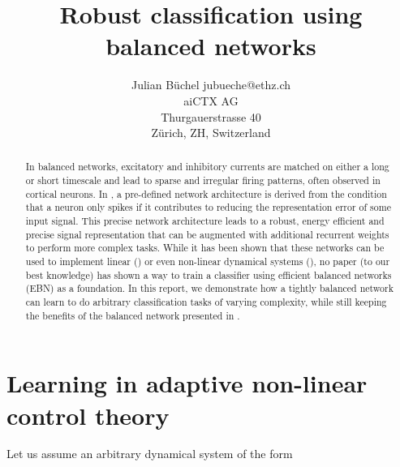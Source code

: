 \documentclass[twoside,11pt,titlepage]{article}
\begin{document}
\title{Robust classification using balanced networks}

\author{\name Julian B\"uchel \email jubueche@ethz.ch \\
       \addr aiCTX AG\\
       Thurgauerstrasse 40 \\
       Z\"urich, ZH, Switzerland}


\maketitle

\newpage
\phantom{.}
\newpage

\tableofcontents
\newpage

\begin{abstract}%
  In balanced networks, excitatory and inhibitory currents are matched on either a long or short timescale and
  lead to sparse and irregular firing patterns, often observed in cortical neurons. In \cite{Bourdoukan:2012:LOS:2999325.2999390},
  a pre-defined network architecture is derived from the condition that a neuron only spikes if it contributes to reducing the
  representation error of some input signal. This precise network architecture leads to a robust, energy efficient and precise signal
  representation that can be augmented with additional recurrent weights to perform more complex tasks. \newline
  While it has been shown that these networks can be used to implement linear (\cite{boerlin}) or even non-linear dynamical systems (\cite{alemi2017learning}),
  no paper (to our best knowledge) has shown a way to train a classifier using efficient balanced networks (EBN) as a foundation. \newline
  In this report, we demonstrate how a tightly balanced network can learn to do arbitrary classification tasks of varying complexity, while still keeping 
  the benefits of the balanced network presented in \cite{Bourdoukan:2012:LOS:2999325.2999390}.
   
\end{abstract}

\newpage

\section{Learning in adaptive non-linear control theory} \label{sec:learning_adap}
Let us assume an arbitrary dynamical system of the form
\end{document}
